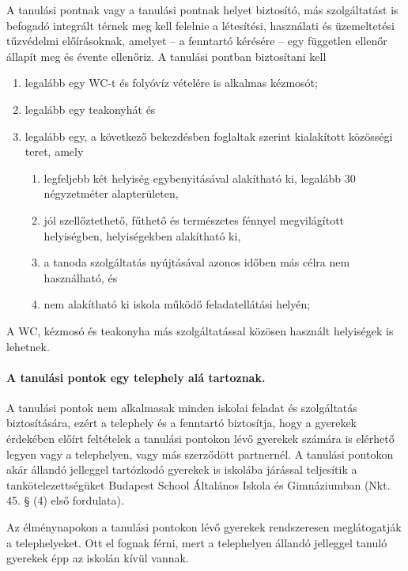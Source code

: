 A tanulási pontnak vagy a tanulási pontnak helyet biztosító, más szolgáltatást is befogadó integrált térnek meg kell felelnie a létesítési, használati és üzemeltetési tűzvédelmi előírásoknak, amelyet -- a fenntartó kérésére -- egy független ellenőr állapít meg és évente ellenőriz. A tanulási pontban biztosítani kell
\begin{enumerate}
    \item legalább egy WC-t és folyóvíz vételére is alkalmas kézmosót;
    \item legalább egy teakonyhát és
    \item   legalább egy, a következő bekezdésben foglaltak szerint kialakított közösségi teret, amely
    \begin{enumerate}
        \item legfeljebb két helyiség egybenyitásával alakítható ki, legalább 30 négyzetméter alapterületen,
        \item jól szellőztethető, fűthető és természetes fénnyel megvilágított helyiségben, helyiségekben alakítható ki,
        \item a tanoda szolgáltatás nyújtásával azonos időben más célra nem használható, és
        \item nem alakítható ki iskola működő feladatellátási helyén;
    \end{enumerate}
\end{enumerate}


A WC, kézmosó és teakonyha más szolgáltatással közösen használt helyiségek is lehetnek.

\paragraph{A tanulási pontok egy telephely alá tartoznak.}

A tanulási pontok nem alkalmasak minden iskolai feladat és szolgáltatás biztosítására, ezért a telephely és a fenntartó biztosítja, hogy a gyerekek érdekében előírt feltételek a tanulási pontokon lévő gyerekek számára is elérhető legyen vagy a telephelyen, vagy más szerződött partnernél. A tanulási pontokon akár állandó jelleggel tartózkodó gyerekek is iskolába járással teljesítik a tankötelezettségüket Budapest School Általános Iskola és Gimnáziumban (Nkt. 45. § (4) első fordulata).

Az élménynapokon a tanulási pontokon lévő gyerekek rendszeresen meglátogatják a telephelyeket. Ott el fognak férni, mert a telephelyen állandó jelleggel tanuló gyerekek épp az iskolán kívül vannak. 

